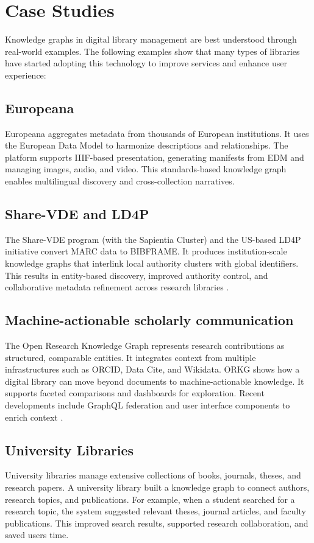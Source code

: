 \documentclass[12pt,a4paper]{article}
\begin{document}
\section{Case Studies}
Knowledge graphs in digital library management are best understood through real-world examples. The following examples show that many types of libraries have started adopting this technology to improve services and enhance user experience: 

\subsection{Europeana}
Europeana aggregates metadata from thousands of European institutions. It uses the European Data Model to harmonize descriptions and relationships. The platform supports IIIF-based presentation, generating manifests from EDM and managing images, audio, and video. This standards-based knowledge graph enables multilingual discovery and cross-collection narratives.

\subsection{Share-VDE and LD4P}
The Share-VDE program (with the Sapientia Cluster) and the US-based LD4P initiative convert MARC data to BIBFRAME. It produces institution-scale knowledge graphs that interlink local authority clusters with global identifiers. This results in entity-based discovery, improved authority control, and collaborative metadata refinement across research libraries \cite{hogan2022kg}.

\subsection{Machine-actionable scholarly communication}
The Open Research Knowledge Graph represents research contributions as structured, comparable entities. It integrates context from multiple infrastructures such as ORCID, Data Cite, and Wikidata. ORKG shows how a digital library can move beyond documents to machine-actionable knowledge. It supports faceted comparisons and dashboards for exploration. Recent developments include GraphQL federation and user interface components to enrich context \cite{haris2021federating}. 

\subsection{University Libraries}
University libraries manage extensive collections of books, journals, theses, and research papers. A university library built a knowledge graph to connect authors, research topics, and publications. For example, when a student searched for a research topic, the system suggested relevant theses, journal articles, and faculty publications. This improved search results, supported research collaboration, and saved users time.
\end{document}
